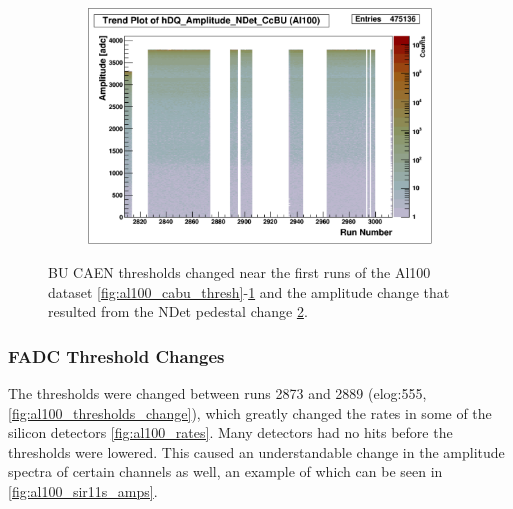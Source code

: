 \documentclass[a4paper]{article}
\begin{document}
\begin{figure}
\begin{subfigure}{0.4\textwidth}
    \caption{}\label{fig:al100_ccbu_thresh}
  \end{subfigure}%
  \begin{subfigure}{0.4\textwidth}
    \includegraphics[width=\linewidth]{figs/al100/ndet_amp}
    \caption{}\label{fig:al100_ndet_amps}
  \end{subfigure}
  \caption{BU CAEN thresholds changed near the first runs of the Al100 dataset \ref{fig:al100_cabu_thresh}-\ref{fig:al100_ccbu_thresh}
    and the amplitude change that resulted from the NDet pedestal change \ref{fig:al100_ndet_amps}.}
  \label{fig:al100_caen_changes}
\end{figure}


\subsubsection{FADC Threshold Changes}
\label{sec:al100_threshold_changes}

The thresholds were changed between runs 2873 and 2889 (elog:555, \ref{fig:al100_thresholds_change}),
which greatly changed the rates in some of the silicon detectors \ref{fig:al100_rates}.
Many detectors had no hits before the thresholds were lowered. This caused an understandable
change in the amplitude spectra of certain channels as well, an example of which can
be seen in \ref{fig:al100_sir11s_amps}.
\end{document}
